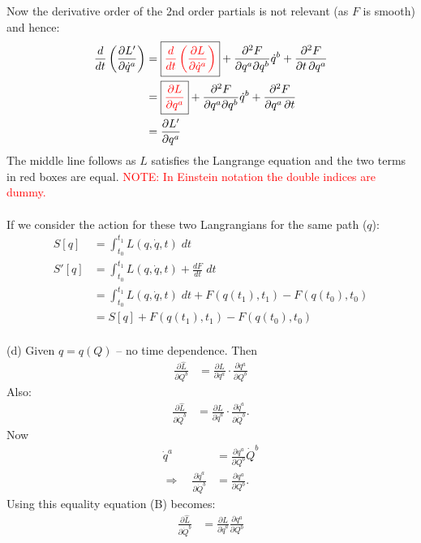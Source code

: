\documentclass[12pt]{article}
\begin{document}
Now the derivative order of the 2nd order partials is not relevant (as $F$ is smooth) and hence:
\begin{align*}
\frac{d}{dt}\left(\frac{\partial L'}{\partial\dot q^a}\right)
&= \boxed{\textcolor{red}{
   \frac{d}{dt}\left(\frac{\partial L}{\partial\dot q^a}\right)}}
 +\frac{\partial^2F}{\partial q^a \partial q^b}\dot q^b
 +\frac{\partial^2F}{\partial t\,\partial q^a}\\
&= \boxed{\textcolor{red}{\frac{\partial L}{\partial q^a}}}
 +\frac{\partial^2F}{\partial q^a \partial q^b}\dot q^b
 +\frac{\partial^2F}{\partial q^a\,\partial t} \\
&= \frac{\partial L'}{\partial q^a}
\end{align*}
The middle line follows as $L$ satisfies the Langrange equation and the two terms in red boxes
are equal. \textcolor{red}{NOTE: In Einstein notation the double indices are dummy.}\\
\\
If we consider the action for these two Langrangians for the same path ($q$):
\begin{align*}
S[q] &= \int_{t_0}^{t_1} L(q, \dot{q}, t) \; dt \\
S'[q] &=  \int_{t_0}^{t_1} L(q, \dot{q}, t) + \frac{dF}{dt} \; dt \\
      &= \int_{t_0}^{t_1} L(q, \dot{q}, t) \; dt + F(q(t_1), t_1) - F(q(t_0), t_0) \\
      &= S[q] + F(q(t_1), t_1) - F(q(t_0), t_0)
\end{align*}
\\
(d)
Given $q=q(Q)$ -- no time dependence.  Then
\begin{align*}
\frac{\partial\hat L}{\partial Q^b}
&=
\frac{\partial L}{\partial q^a}
\cdot
\frac{\partial q^a}{\partial Q^b} \tag{A}
\end{align*}
Also:
\begin{align*}
\frac{\partial\hat L}{\partial\dot Q^b}
&=
\frac{\partial L}{\partial\dot q^a}
\cdot
\frac{\partial\dot q^a}{\partial\dot Q^b}.
\tag{B}
\end{align*}
Now
\begin{align*}
\dot q^a
&=
\frac{\partial q^a}{\partial Q^b}\dot Q^b\\
\Rightarrow\quad
\frac{\partial\dot q^a}{\partial\dot Q^b}
&=
\frac{\partial q^a}{\partial Q^b}.
\tag{C}
\end{align*}
Using this equality equation (B) becomes:
\begin{align*}
\frac{\partial\hat L}{\partial\dot Q^b}
&=
\frac{\partial L}{\partial\dot q^a}
\frac{\partial q^a}{\partial Q^b} \tag{D}
\end{align*}
\end{document}
